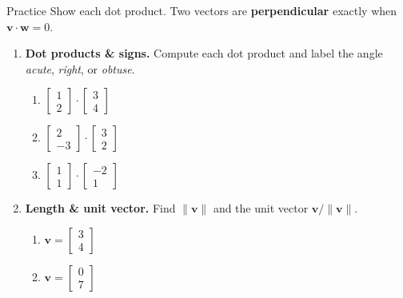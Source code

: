 \documentclass[10pt]{article}
\newcommand{\vv}{\mathbf{v}}
\newcommand{\ww}{\mathbf{w}}
\begin{document}
\namedateperiod

\vspace{0.12in}

\begin{notesbox}{Practice}
Show each dot product. Two vectors are \textbf{perpendicular} exactly when
$\vv\cdot\ww=0$.

\begin{enumerate}[leftmargin=1.9em, itemsep=12pt]
  \item \textbf{Dot products \& signs.} Compute each dot product and label the angle
        \emph{acute}, \emph{right}, or \emph{obtuse}.
    \begin{enumerate}[label=(\alph*), leftmargin=1.8em, itemsep=4pt]
      \item $\begin{bmatrix} 1 \\ 2 \end{bmatrix}\cdot\begin{bmatrix} 3 \\ 4 \end{bmatrix}$ \hfill
      \item $\begin{bmatrix} 2 \\ -3 \end{bmatrix}\cdot\begin{bmatrix} 3 \\ 2 \end{bmatrix}$ \hfill
      \item $\begin{bmatrix} 1 \\ 1 \end{bmatrix}\cdot\begin{bmatrix} -2 \\ 1 \end{bmatrix}$
    \end{enumerate}
    \vspace{1.0cm}
  \item \textbf{Length \& unit vector.} Find $\|\vv\|$ and the unit vector $\vv/\|\vv\|$.
    \begin{enumerate}[label=(\alph*), leftmargin=1.8em, itemsep=4pt]
      \item $\vv=\begin{bmatrix} 3 \\ 4 \end{bmatrix}$ \hfill
      \item $\vv=\begin{bmatrix} 0 \\ 7 \end{bmatrix}$

\end{enumerate}
\end{enumerate}
\end{notesbox}
\end{document}

